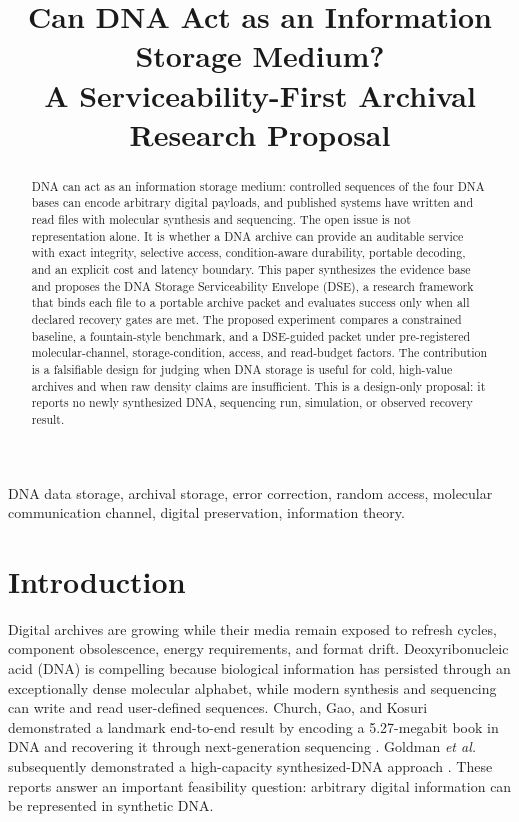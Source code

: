\documentclass[conference]{IEEEtran}
\begin{document}
\title{Can DNA Act as an Information Storage Medium?\\
\large A Serviceability-First Archival Research Proposal}

\author{
}

\maketitle

\begin{abstract}
DNA can act as an information storage medium: controlled sequences of the four DNA bases can encode arbitrary digital payloads, and published systems have written and read files with molecular synthesis and sequencing. The open issue is not representation alone. It is whether a DNA archive can provide an auditable service with exact integrity, selective access, condition-aware durability, portable decoding, and an explicit cost and latency boundary. This paper synthesizes the evidence base and proposes the DNA Storage Serviceability Envelope (DSE), a research framework that binds each file to a portable archive packet and evaluates success only when all declared recovery gates are met. The proposed experiment compares a constrained baseline, a fountain-style benchmark, and a DSE-guided packet under pre-registered molecular-channel, storage-condition, access, and read-budget factors. The contribution is a falsifiable design for judging when DNA storage is useful for cold, high-value archives and when raw density claims are insufficient. This is a design-only proposal: it reports no newly synthesized DNA, sequencing run, simulation, or observed recovery result.
\end{abstract}

\begin{IEEEkeywords}
DNA data storage, archival storage, error correction, random access, molecular communication channel, digital preservation, information theory.
\end{IEEEkeywords}

\section{Introduction}

Digital archives are growing while their media remain exposed to refresh cycles, component obsolescence, energy requirements, and format drift. Deoxyribonucleic acid (DNA) is compelling because biological information has persisted through an exceptionally dense molecular alphabet, while modern synthesis and sequencing can write and read user-defined sequences. Church, Gao, and Kosuri demonstrated a landmark end-to-end result by encoding a 5.27-megabit book in DNA and recovering it through next-generation sequencing \cite{church2012}. Goldman \textit{et al.} subsequently demonstrated a high-capacity synthesized-DNA approach \cite{goldman2013}. These reports answer an important feasibility question: arbitrary digital information can be represented in synthetic DNA.
\end{document}
